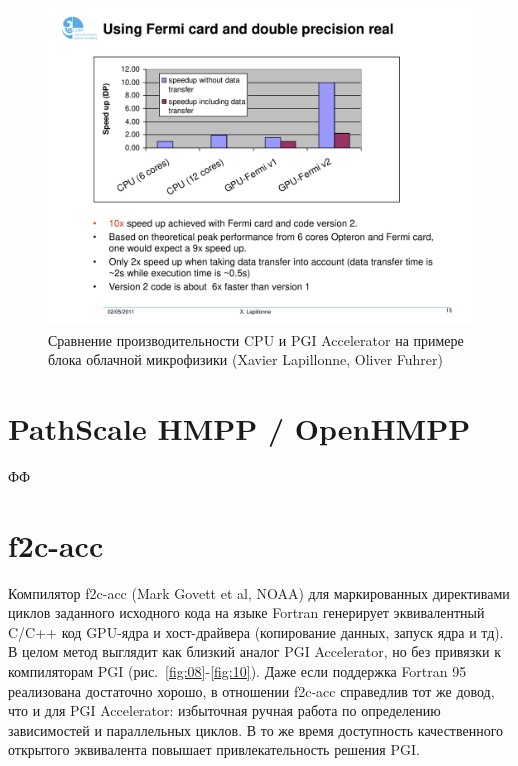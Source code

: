 \documentclass[a4,12pt]{report}
\begin{document}
\begin{figure}
\centering
\includegraphics[scale=0.4]{slides/07.pdf}
\caption{Сравнение производительности CPU и PGI Accelerator на примере блока облачной микрофизики (Xavier Lapillonne, Oliver Fuhrer)}
\label{fig:07}
\end{figure}

\section{PathScale HMPP / OpenHMPP}

ФФ

\section{f2c-acc}

Компилятор f2c-acc (Mark Govett et al, NOAA) для маркированных директивами циклов заданного исходного кода на языке Fortran генерирует эквивалентный C/C++ код GPU-ядра и хост-драйвера (копирование данных, запуск ядра и тд). В целом метод выглядит как близкий аналог PGI Accelerator, но без привязки к компиляторам PGI (рис.~\ref{fig:08}-\ref{fig:10}). Даже если поддержка Fortran 95 реализована достаточно хорошо, в отношении f2c-acc справедлив тот же довод, что и для PGI Accelerator: избыточная ручная работа по определению зависимостей и параллельных циклов. В то же время доступность качественного открытого эквивалента повышает привлекательность решения PGI.
\end{document}
